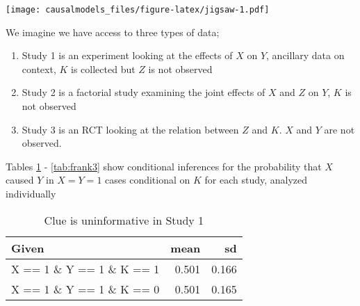 \documentclass[
  12pt,
]{book}
\newenvironment{Shaded}{\begin{snugshade}}{\end{snugshade}}
\newcommand{\DataTypeTok}[1]{\textcolor[rgb]{0.13,0.29,0.53}{#1}}
\newcommand{\DecValTok}[1]{\textcolor[rgb]{0.00,0.00,0.81}{#1}}
\newcommand{\KeywordTok}[1]{\textcolor[rgb]{0.13,0.29,0.53}{\textbf{#1}}}
\newcommand{\NormalTok}[1]{#1}
\newcommand{\OperatorTok}[1]{\textcolor[rgb]{0.81,0.36,0.00}{\textbf{#1}}}
\newcommand{\OtherTok}[1]{\textcolor[rgb]{0.56,0.35,0.01}{#1}}
\newcommand{\StringTok}[1]{\textcolor[rgb]{0.31,0.60,0.02}{#1}}
\providecommand{\tightlist}{%
  \setlength{\itemsep}{0pt}\setlength{\parskip}{0pt}}
\begin{document}
\texttt{[image: causalmodels\_files/figure-latex/jigsaw-1.pdf]}

We imagine we have access to three types of data;

\begin{enumerate}
\def\labelenumi{\arabic{enumi}.}
\tightlist
\item
  Study 1 is an experiment looking at the effects of \(X\) on \(Y\), ancillary data on context, \(K\) is collected but \(Z\) is not observed
\item
  Study 2 is a factorial study examining the joint effects of \(X\) and \(Z\) on \(Y\), \(K\) is not observed
\item
  Study 3 is an RCT looking at the relation between \(Z\) and \(K\). \(X\) and \(Y\) are not observed.
\end{enumerate}

\begin{Shaded}
\end{Shaded}

Tables \ref{tab:frank1} - \ref{tab:frank3} show conditional inferences for the probability that \(X\) caused \(Y\) in \(X=Y=1\) cases conditional on \(K\) for each study, analyzed individually

\begin{table}

\caption{\label{tab:frank1}Clue is uninformative in Study 1}
\centering
\begin{tabular}[t]{l|r|r}
\hline
Given & mean & sd\\
\hline
X == 1 \& Y == 1 \& K == 1 & 0.501 & 0.166\\
\hline
X == 1 \& Y == 1 \& K == 0 & 0.501 & 0.165\\
\hline
\end{tabular}
\end{table}
\end{document}

